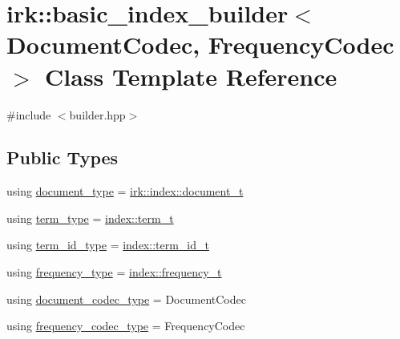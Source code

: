 \hypertarget{classirk_1_1basic__index__builder}{}\section{irk\+:\+:basic\+\_\+index\+\_\+builder$<$ Document\+Codec, Frequency\+Codec $>$ Class Template Reference}
\label{classirk_1_1basic__index__builder}


{\ttfamily \#include $<$builder.\+hpp$>$}

\subsection*{Public Types}
\begin{DoxyCompactItemize}
\item 
using \mbox{\hyperlink{classirk_1_1basic__index__builder_a757a96c8851f4aeee2014a74f60b183e}{document\+\_\+type}} = \mbox{\hyperlink{namespaceirk_1_1index_af829dedea20da89f9b51b49d78f57006}{irk\+::index\+::document\+\_\+t}}
\item 
using \mbox{\hyperlink{classirk_1_1basic__index__builder_a612e4d83700711a72d442056226a2908}{term\+\_\+type}} = \mbox{\hyperlink{namespaceirk_1_1index_a7c2517c1f98e5b5f30ba3ab2f837caf6}{index\+::term\+\_\+t}}
\item 
using \mbox{\hyperlink{classirk_1_1basic__index__builder_a468351209183fbd35691ab9b75f10d61}{term\+\_\+id\+\_\+type}} = \mbox{\hyperlink{namespaceirk_1_1index_ae2ce3a02969196fe6dab4443ed2007d5}{index\+::term\+\_\+id\+\_\+t}}
\item 
using \mbox{\hyperlink{classirk_1_1basic__index__builder_a17364f665244bc4dc6b021f52442f794}{frequency\+\_\+type}} = \mbox{\hyperlink{namespaceirk_1_1index_aa2cb48e79abd95deb25bbdf36c0ea70f}{index\+::frequency\+\_\+t}}
\item 
using \mbox{\hyperlink{classirk_1_1basic__index__builder_a8e4abd85a04c6a2801c66d2c6630841c}{document\+\_\+codec\+\_\+type}} = Document\+Codec
\item 
using \mbox{\hyperlink{classirk_1_1basic__index__builder_afbcd5c7087007a9d832bc43e89a9533b}{frequency\+\_\+codec\+\_\+type}} = Frequency\+Codec
\end{DoxyCompactItemize}

